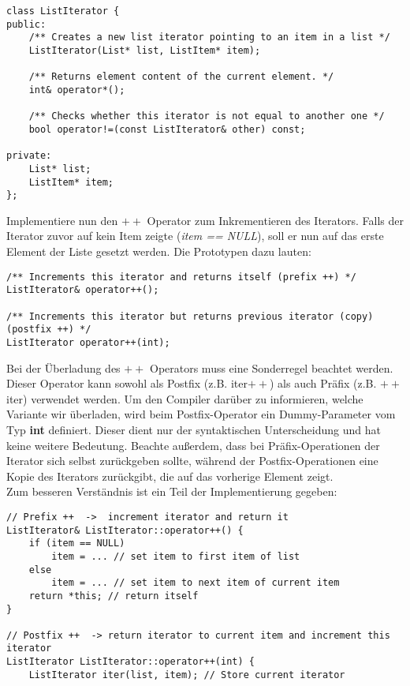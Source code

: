 \begin{enumerate}
\begin{lstlisting}
class ListIterator {
public:
	/** Creates a new list iterator pointing to an item in a list */
	ListIterator(List* list, ListItem* item);

	/** Returns element content of the current element. */
	int& operator*();

	/** Checks whether this iterator is not equal to another one */
	bool operator!=(const ListIterator& other) const;

private:
	List* list;
	ListItem* item;
};
\end{lstlisting} 


Implementiere nun den \textbf{$++$} Operator zum Inkrementieren des Iterators.
Falls der Iterator zuvor auf kein Item zeigte (\emph{item == NULL}), soll er nun auf das erste Element der Liste gesetzt werden.
Die Prototypen dazu lauten:
\begin{lstlisting}
/** Increments this iterator and returns itself (prefix ++) */
ListIterator& operator++();
	
/** Increments this iterator but returns previous iterator (copy) (postfix ++) */
ListIterator operator++(int);
\end{lstlisting} 

Bei der Überladung des \textbf{$++$} Operators muss eine Sonderregel beachtet werden.
Dieser Operator kann sowohl als Postfix (z.B. iter$++$) als auch Präfix (z.B. $++$iter) verwendet werden.
Um den Compiler darüber zu informieren, welche Variante wir überladen, wird beim Postfix-Operator ein Dummy-Parameter vom Typ \textbf{int} definiert.
Dieser dient nur der syntaktischen Unterscheidung und hat keine weitere Bedeutung.
Beachte außerdem, dass bei Präfix-Operationen der Iterator sich selbst zurückgeben sollte, während der Postfix-Operationen eine Kopie des Iterators zurückgibt, die auf das vorherige Element zeigt. \\

Zum besseren Verständnis ist ein Teil der Implementierung gegeben: 

\begin{lstlisting}
// Prefix ++  ->  increment iterator and return it
ListIterator& ListIterator::operator++() {
	if (item == NULL)
		item = ... // set item to first item of list
	else
		item = ... // set item to next item of current item
	return *this; // return itself
}

// Postfix ++  -> return iterator to current item and increment this iterator
ListIterator ListIterator::operator++(int) {
	ListIterator iter(list, item); // Store current iterator 
	

\end{lstlisting}
\end{enumerate}
